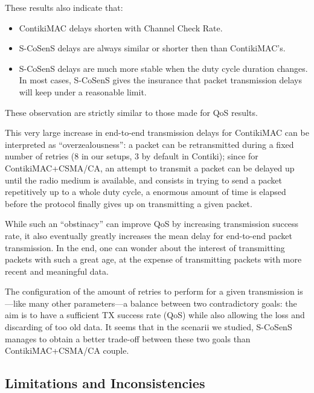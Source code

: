 \documentclass[a4paper,twoside]{article}
\begin{document}
These results also indicate that:

\begin{itemize}

\item ContikiMAC delays shorten with Channel Check Rate.

\item S-CoSenS delays are always similar or shorter then than ContikiMAC's.

\item S-CoSenS delays are much more stable when the duty cycle duration
      changes. In most cases, S-CoSenS gives the insurance that packet
      transmission delays will keep under a reasonable limit.

\end{itemize}

These observation are strictly similar to those made for QoS results.

This very large increase in end-to-end transmission delays for ContikiMAC
can be interpreted as ``overzealousness'': a packet can be retransmitted
during a fixed number of retries (8 in our setups, 3 by default in Contiki);
since for ContikiMAC+CSMA/CA, an attempt to transmit a packet can be delayed
up until the radio medium is available, and consists in trying to send
a packet repetitively up to a whole duty cycle, a enormous amount of time
is elapsed before the protocol finally gives up on transmitting a given
packet.

While such an ``obstinacy'' can improve QoS by increasing transmission
success rate, it also eventually greatly increases the mean delay for
end-to-end packet transmission. In the end, one can wonder about the
interest of transmitting packets with such a great age, at the expense
of transmitting packets with more recent and meaningful data.

The configuration of the amount of retries to perform for a given
transmission is---like many other parameters---a balance between two
contradictory goals: the aim is to have a sufficient TX success rate (QoS)
while also allowing the loss and discarding of too old data. It seems
that in the scenarii we studied, S-CoSenS manages to obtain a better
trade-off between these two goals than ContikiMAC+CSMA/CA couple.



\subsection{Limitations and Inconsistencies}
\label{SectLimits}
\end{document}
